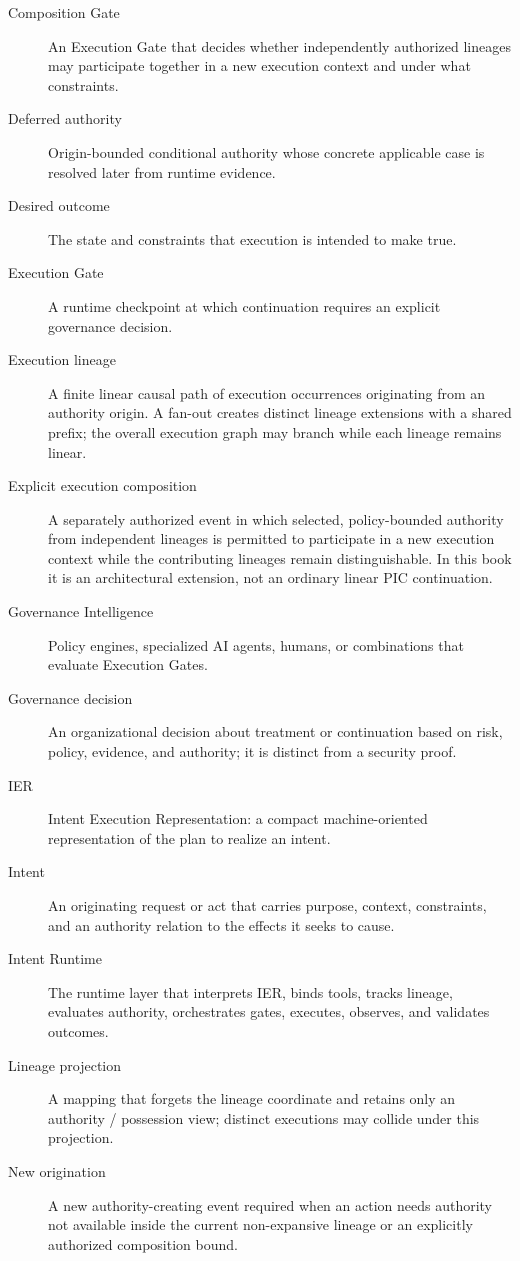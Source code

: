 \documentclass[10pt,oneside,openany]{book}
\begin{document}
\begin{description}
\item[Composition Gate] An Execution Gate that decides whether independently authorized lineages may participate together in a new execution context and under what constraints.
\item[Deferred authority] Origin-bounded conditional authority whose concrete applicable case is resolved later from runtime evidence.
\item[Desired outcome] The state and constraints that execution is intended to make true.
\item[Execution Gate] A runtime checkpoint at which continuation requires an explicit governance decision.
\item[Execution lineage] A finite linear causal path of execution occurrences originating from an authority origin. A fan-out creates distinct lineage extensions with a shared prefix; the overall execution graph may branch while each lineage remains linear.
\item[Explicit execution composition] A separately authorized event in which selected, policy-bounded authority from independent lineages is permitted to participate in a new execution context while the contributing lineages remain distinguishable. In this book it is an architectural extension, not an ordinary linear PIC continuation.
\item[Governance Intelligence] Policy engines, specialized AI agents, humans, or combinations that evaluate Execution Gates.
\item[Governance decision] An organizational decision about treatment or continuation based on risk, policy, evidence, and authority; it is distinct from a security proof.
\item[IER] Intent Execution Representation: a compact machine-oriented representation of the plan to realize an intent.
\item[Intent] An originating request or act that carries purpose, context, constraints, and an authority relation to the effects it seeks to cause.
\item[Intent Runtime] The runtime layer that interprets IER, binds tools, tracks lineage, evaluates authority, orchestrates gates, executes, observes, and validates outcomes.
\item[Lineage projection] A mapping that forgets the lineage coordinate and retains only an authority / possession view; distinct executions may collide under this projection.
\item[New origination] A new authority-creating event required when an action needs authority not available inside the current non-expansive lineage or an explicitly authorized composition bound.

\end{description}
\end{document}
